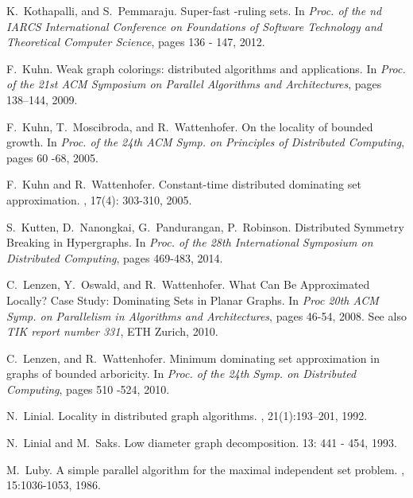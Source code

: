 \documentclass[11pt]{article}
\begin{document}
\begin{thebibliography}{10}
K.~Kothapalli, and S.~Pemmaraju.
\newblock Super-fast -ruling sets.
\newblock In {\em Proc. of the nd IARCS International Conference on Foundations of Software Technology and Theoretical Computer Science}, pages 136 - 147, 2012.



F.~Kuhn.
\newblock Weak graph colorings: distributed algorithms and applications. 
\newblock In {\em Proc. of the 21st ACM Symposium on Parallel Algorithms and Architectures},  pages 138--144, 2009.



F.~Kuhn, T.~Moscibroda, and R.~Wattenhofer.
\newblock On the locality of bounded growth.
\newblock In {\em Proc. of the 24th ACM Symp. on Principles of Distributed Computing}, pages 60 -68, 2005.



F.~Kuhn and R.~Wattenhofer.
\newblock Constant-time distributed dominating set approximation.
, 17(4): 303-310, 2005.


S.~Kutten, D.~Nanongkai, G.~Pandurangan, P.~Robinson.
\newblock Distributed Symmetry Breaking in Hypergraphs.
\newblock In {\em Proc. of the 28th International Symposium on Distributed Computing}, pages 469-483, 2014.

C.~Lenzen, Y.~Oswald, and R.~Wattenhofer.
\newblock What Can Be Approximated Locally? Case Study: Dominating Sets in Planar Graphs.
\newblock In {\em Proc 20th ACM Symp. on Parallelism in Algorithms and Architectures}, pages 46-54, 2008.
\newblock See also {\em TIK report number 331}, ETH Zurich, 2010.

C.~Lenzen, and R.~Wattenhofer.
\newblock Minimum dominating set approximation in graphs of bounded arboricity.
\newblock In {\em Proc. of the 24th Symp. on Distributed Computing}, pages 510 -524, 2010.



N.~Linial.
\newblock Locality in distributed graph algorithms.
, 21(1):193--201, 1992.

N.~Linial and M.~Saks.
\newblock Low diameter graph decomposition.
 13: 441 - 454, 1993.



M.~Luby.
\newblock A simple parallel algorithm for the maximal independent set problem.
, 15:1036-1053, 1986.




\end{thebibliography}
\end{document}

